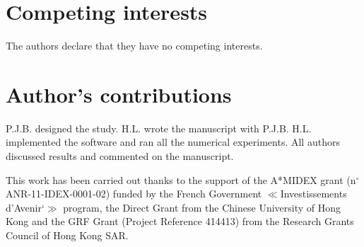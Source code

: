 \documentclass[twocolumn]{bmcart}
\begin{document}

\begin{backmatter}

\section*{Competing interests}
The authors declare that they have no competing interests.

\section*{Author's contributions}
P.J.B. designed the study. H.L. wrote the manuscript with P.J.B. H.L. implemented the software and ran all the numerical experiments. All authors discussed results and commented on the manuscript.

This work has been carried out thanks to the support of the A*MIDEX grant (n$^{\circ}$ ANR-11-IDEX-0001-02) funded by the French Government $\ll$Investissements d’Avenir`$\gg$ program, the Direct Grant from the Chinese University of Hong Kong and the GRF Grant (Project Reference 414413) from the Research Grants Council of Hong Kong SAR.




\end{backmatter}
\end{document}
